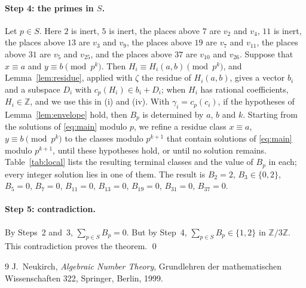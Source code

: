 \documentclass[11pt]{article}
\newcommand{\Z}{\mathbb{Z}}
\begin{document}
\paragraph{Step 4: the primes in $S$.} Let $p\in S$. Here $2$ is inert, $5$ is inert, the places above $7$ are $v_{2}$ and $v_{4}$, $11$ is inert, the places above $13$ are $v_{3}$ and $v_{9}$, the places above $19$ are $v_{7}$ and $v_{11}$, the places above $31$ are $v_{5}$ and $v_{25}$, and the places above $37$ are $v_{10}$ and $v_{26}$. Suppose that $x\equiv a$ and $y\equiv b\pmod{p^k}$. Then $H_i\equiv H_i(a,b)\pmod{p^k}$, and Lemma~\ref{lem:residue}, applied with $\zeta$ the residue of $H_i(a,b)$, gives a vector $b_i$ and a subspace $D_i$ with $c_p(H_i)\in b_i+D_i$; when $H_i$ has rational coefficients, $H_i\in\Z$, and we use this in (i) and (iv). With $\gamma_i=c_p(c_i)$, if the hypotheses of Lemma~\ref{lem:envelope} hold, then $B_p$ is determined by $a$, $b$ and $k$. Starting from the solutions of \eqref{eq:main} modulo $p$, we refine a residue class $x\equiv a$, $y\equiv b\pmod{p^k}$ to the classes modulo $p^{k+1}$ that contain solutions of \eqref{eq:main} modulo $p^{k+1}$, until these hypotheses hold, or until no solution remains. Table~\ref{tab:local} lists the resulting terminal classes and the value of $B_p$ in each; every integer solution lies in one of them. The result is $B_{2}=2$, $B_{3}\in\{0,2\}$, $B_{5}=0$, $B_{7}=0$, $B_{11}=0$, $B_{13}=0$, $B_{19}=0$, $B_{31}=0$, $B_{37}=0$.

\paragraph{Step 5: contradiction.} By Steps~2 and~3, $\sum_{p\in S}B_p=0$. But by Step~4, $\sum_{p\in S}B_p\in\{1,2\}$ in $\Z/3\Z$. This contradiction proves the theorem.
\qed


\begin{thebibliography}{9}
 J.~Neukirch, \emph{Algebraic Number Theory}, Grundlehren der mathematischen Wissenschaften 322, Springer, Berlin, 1999.
\end{thebibliography}
\end{document}
